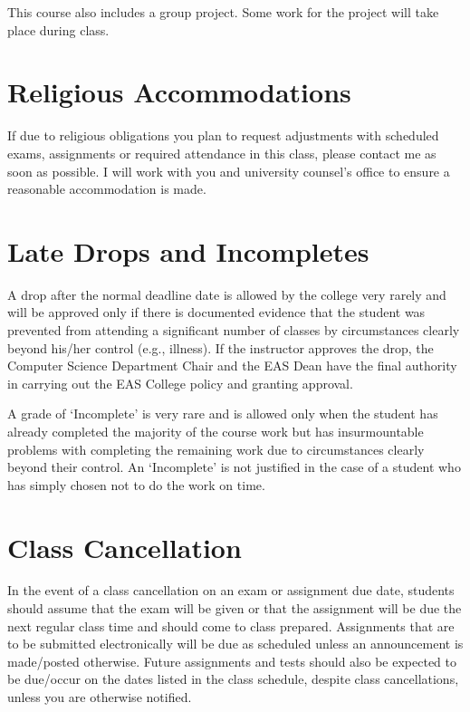 \documentclass[11pt]{article}
\begin{document}
This course also includes a group project. Some work for the project will take place during class.

\section*{Religious Accommodations}

If due to religious obligations you plan to request adjustments with scheduled exams, assignments or required attendance in this class, please contact me as soon as possible. I will work with you and university counsel's office to ensure a reasonable accommodation is made.

\section*{Late Drops and Incompletes}

A drop after the normal deadline date is allowed by the college very rarely and will be approved only if there is documented evidence that the student was prevented from attending a significant number of classes by circumstances clearly beyond his/her control (e.g., illness). If the instructor approves the drop, the Computer Science Department Chair and the EAS Dean have the final authority in carrying out the EAS College policy and granting approval.

A grade of `Incomplete' is very rare and is allowed only when the student has already completed the majority of the course work but has insurmountable problems with completing the remaining work due to circumstances clearly beyond their control. An `Incomplete' is not justified in the case of a student who has simply chosen not to do the work on time.

\section*{Class Cancellation}

In the event of a class cancellation on an exam or assignment due date, students should assume that the exam will be given or that the assignment will be due the next regular class time and should come to class prepared. Assignments that are to be submitted electronically will be due as scheduled unless an announcement is made/posted otherwise. Future assignments and tests should also be expected to be due/occur on the dates listed in the class schedule, despite class cancellations, unless you are otherwise notified.
\end{document}
